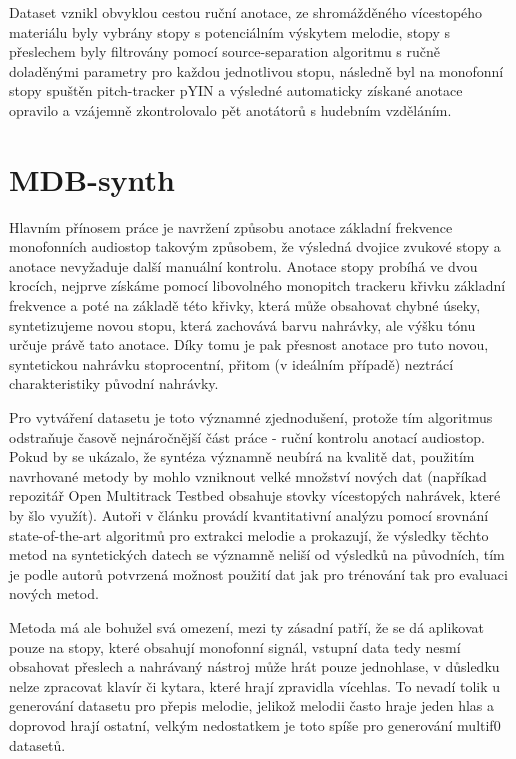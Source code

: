 Dataset vznikl obvyklou cestou ruční anotace, ze shromážděného vícestopého materiálu byly vybrány stopy s potenciálním výskytem melodie, stopy s přeslechem byly filtrovány pomocí source-separation algoritmu s ručně doladěnými parametry pro každou jednotlivou stopu, následně byl na monofonní stopy spuštěn pitch-tracker pYIN a výsledné automaticky získané anotace opravilo a vzájemně zkontrolovalo pět anotátorů s hudebním vzděláním. 

\section{MDB-synth}

Hlavním přínosem práce \cite{Salamon2017} je navržení způsobu anotace základní frekvence monofonních audiostop takovým způsobem, že výsledná dvojice zvukové stopy a anotace nevyžaduje další manuální kontrolu. Anotace stopy probíhá ve dvou krocích, nejprve získáme pomocí libovolného monopitch trackeru křivku základní frekvence a poté na základě této křivky, která může obsahovat chybné úseky, syntetizujeme novou stopu, která zachovává barvu nahrávky, ale výšku tónu určuje právě tato anotace. Díky tomu je pak přesnost anotace pro tuto novou, syntetickou nahrávku stoprocentní, přitom (v ideálním případě) neztrácí charakteristiky původní nahrávky.

Pro vytváření datasetu je toto významné zjednodušení, protože tím algoritmus odstraňuje časově nejnáročnější část práce - ruční kontrolu anotací audiostop. Pokud by se ukázalo, že syntéza významně neubírá na kvalitě dat, použitím navrhované metody by mohlo vzniknout velké množství nových dat (napříkad repozitář Open Multitrack Testbed obsahuje stovky vícestopých nahrávek, které by šlo využít). Autoři v článku provádí kvantitativní analýzu pomocí srovnání state-of-the-art algoritmů pro extrakci melodie a prokazují, že výsledky těchto metod na syntetických datech se významně neliší od výsledků na původních, tím je podle autorů potvrzená možnost použití dat jak pro trénování tak pro evaluaci nových metod.

Metoda má ale bohužel svá omezení, mezi ty zásadní patří, že se dá aplikovat pouze na stopy, které obsahují monofonní signál, vstupní data tedy nesmí obsahovat přeslech a nahrávaný nástroj může hrát pouze jednohlase, v důsledku nelze zpracovat klavír či kytara, které hrají zpravidla vícehlas. To nevadí tolik u generování datasetu pro přepis melodie, jelikož melodii často hraje jeden hlas a doprovod hrají ostatní, velkým nedostatkem je toto spíše pro generování multif0 datasetů.

